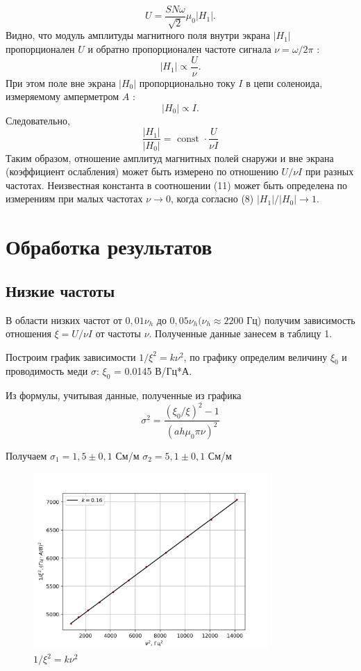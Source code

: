 \documentclass[a4paper, 12pt]{article}
\begin{document}
$$
U=\frac{S N \omega}{\sqrt{2}} \mu_0\left|H_1\right| .
$$
Видно, что модуль амплитуды магнитного поля внутри экрана $\left|H_1\right|$ пропорционален $U$ и обратно пропорционален частоте сигнала $\nu=\omega / 2 \pi$ :
$$
\left|H_1\right| \propto \frac{U}{\nu} .
$$
При этом поле вне экрана $\left|H_0\right|$ пропорционально току $I$ в цепи соленоида, измеряемому амперметром $A$ :
$$
\left|H_0\right| \propto I .
$$
Следовательно,
\begin{equation}
\frac{\left|H_1\right|}{\left|H_0\right|}=\text { const } \cdot \frac{U}{\nu I}
\end{equation}
Таким образом, отношение амплитуд магнитных полей снаружи и вне экрана (коэффициент ослабления) может быть измерено по отношению $U / \nu I$ при разных частотах. Неизвестная константа в соотношении (11) может быть определена по измерениям при малых частотах $\nu \rightarrow 0$, когда согласно (8) $\left|H_1\right| /\left|H_0\right| \rightarrow 1$.


\section{Обработка результатов}
\subsection*{Низкие частоты}
В области низких частот от $ 0,01\nu_h \text{ до }  0,05\nu_h (\nu_h \approx 2200$ Гц) получим зависимость отношения $\xi = U/\nu I $ от частоты $\nu$. Полученные данные занесем в таблицу 1.

Построим график зависимости $1/\xi^2 = k \nu^2$, по графику определим величину $\xi_0$ и проводимость меди $\sigma$: $\xi_0$ = 0.0145 В/Гц*А.

Из формулы, учитывая данные, полученные из графика
\begin{equation}
	\sigma^2 = \frac{(\xi_0/\xi)^2 - 1}{(ah\mu_0\pi\nu)^2}
\end{equation}

Получаем
$ \sigma_{1} =  1,5 \pm 0,1$ См/м
$ \sigma_{2} =  5,1 \pm 0,1$ См/м
\begin{figure}[H]
    \centering
    \includegraphics[width=0.8\textwidth]{nu2}
    \caption{$1/\xi^2 = k \nu^2$}
    \label{fig:nu2}
\end{figure}
\end{document}
